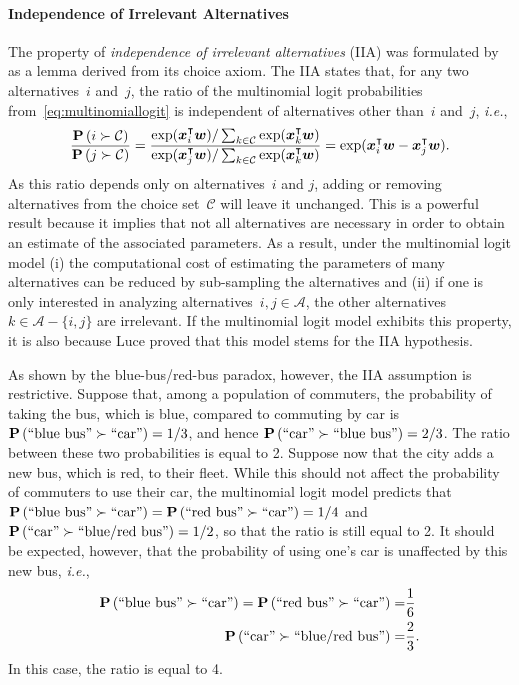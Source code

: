 \paragraph{Independence of Irrelevant Alternatives}

The property of \emph{independence of irrelevant alternatives} (IIA) was formulated by~\citet{luce1959individual} as a lemma derived from its choice axiom.
The IIA states that, for any two alternatives~$i$ and~$j$, the ratio of the multinomial logit probabilities from~\eqref{eq:multinomiallogit} is independent of alternatives other than~$i$ and~$j$, \textit{i.e.},
\begin{equation}
	\frac{\mathbf{P}\left( i \succ \mathcal{C} \right)}{\mathbf{P}\left( j \succ \mathcal{C} \right)}
	= \frac{\exp(\bm{x}_i^\intercal \bm{w}) / \sum_{k \in \mathcal{C}} \exp(\bm{x}_k^\intercal \bm{w})}{\exp(\bm{x}_j^\intercal \bm{w}) / \sum_{k \in \mathcal{C}} \exp(\bm{x}_k^\intercal \bm{w})}
	= \exp(\bm{x}_i^\intercal \bm{w} - \bm{x}_j^\intercal \bm{w}).
\end{equation}
As this ratio depends only on alternatives~$i$ and $j$, adding or removing alternatives from the choice set~$\mathcal{C}$ will leave it unchanged.
This is a powerful result because it implies that not all alternatives are necessary in order to obtain an estimate of the associated parameters.
As a result, under the multinomial logit model (i) the computational cost of estimating the parameters of many alternatives can be reduced by sub-sampling the alternatives and (ii) if one is only interested in analyzing alternatives~$i,j \in \mathcal{A}$, the other alternatives~$k \in \mathcal{A} - \{i, j\}$ are irrelevant.
If the multinomial logit model exhibits this property, it is also because Luce proved that this model stems for the IIA hypothesis.

As shown by the blue-bus/red-bus paradox, however, the IIA assumption is restrictive.
Suppose that, among a population of commuters, the probability of taking the bus, which is blue, compared to commuting by car is $\mathbf{P}\left( \text{``blue bus''} \succ \text{``car''} \right) = 1/3$, and hence $\mathbf{P}\left( \text{``car''} \succ \text{``blue bus''} \right) = 2/3$.
The ratio between these two probabilities is equal to 2.
Suppose now that the city adds a new bus, which is red, to their fleet.
While this should not affect the probability of commuters to use their car, the multinomial logit model predicts that $\mathbf{P}\left( \text{``blue bus''} \succ \text{``car''} \right) = \mathbf{P}\left( \text{``red bus''} \succ \text{``car''} \right) = 1/4$ and $\mathbf{P}\left( \text{``car''} \succ \text{``blue/red bus''} \right) = 1/2$, so that the ratio is still equal to 2.
It should be expected, however, that the probability of using one's car is unaffected by this new bus, \textit{i.e.},
\begin{align*}
	\mathbf{P}\left( \text{``blue bus''} \succ \text{``car''} \right) =  \mathbf{P}\left( \text{``red bus''} \succ \text{``car''} \right) = & \frac{1}{6}  \\
	\mathbf{P}\left( \text{``car''} \succ \text{``blue/red bus''} \right) =                                               & \frac{2}{3}.
\end{align*}
In this case, the ratio is equal to 4.

